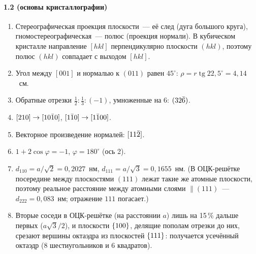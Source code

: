 {\paragraph{1.2 (основы кристаллографии)}
\begin{enumerate}[label=\arabic*.]
\item Стереографическая проекция плоскости~— её след (дуга большого
круга), гномостереографическая~— полюс (проекция нормали). В
кубическом кристалле направление $[hkl]$ перпендикулярно плоскости
$(hkl)$, поэтому полюс $(hkl)$ совпадает с выходом $[hkl]$.
\item Угол между $[001]$ и нормалью к $(011)$ равен $45^\circ$:
$\rho=r\operatorname{tg}22{,}5^\circ=4{,}14$~см.
\item Обратные отрезки $\frac12:\frac13:(-1)$, умноженные на 6: $(32\bar{6})$.
\item $[210]\to[10\bar{1}0]$, $[1\bar{1}0]\to[1\bar{1}00]$.
\item Векторное произведение нормалей: $[11\bar{2}]$.
\item $1+2\cos\varphi=-1$, $\varphi=180^\circ$ (ось 2).
\item $d_{110}=a/\sqrt2=0{,}2027$~нм, $d_{111}=a/\sqrt3=0{,}1655$~нм. (В
ОЦК-решётке посередине между плоскостями $(111)$ лежат такие же атомные
плоскости, поэтому реальное расстояние между атомными слоями $\parallel(111)$~—
$d_{222}=0{,}083$~нм; отражение $111$ погасает.)
\item Вторые соседи в ОЦК-решётке (на расстоянии $a$) лишь на 15\,\%
дальше первых ($a\sqrt3/2$), и плоскости $\{100\}$, делящие пополам
отрезки до них, срезают вершины октаэдра из плоскостей $\{111\}$:
получается усечённый октаэдр (8 шестиугольников и 6 квадратов).
\end{enumerate}

}
